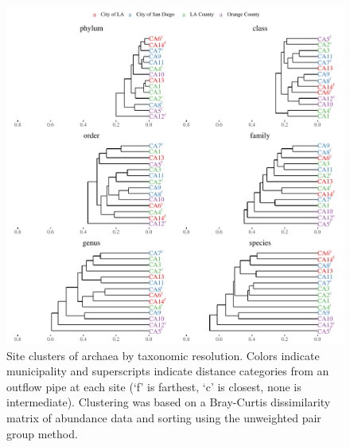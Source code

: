 \documentclass[letterpaper,12pt]{article}\usepackage[]{graphicx}\usepackage[]{color}
\newenvironment{knitrout}{}{} %
\begin{document}
\begin{knitrout}
\color{fgcolor}\begin{figure}[!ht]

{\centering \includegraphics[width=\textwidth]{figs/clust1_arch-1} 

}

\caption[Site clusters of archaea by taxonomic resolution]{Site clusters of archaea by taxonomic resolution.  Colors indicate municipality and superscripts indicate distance categories from an outflow pipe at each site (`f' is farthest, `c' is closest, none is intermediate).  Clustering was based on a Bray-Curtis dissimilarity matrix of abundance data and sorting using the unweighted pair group method.}\label{fig:clust1_arch}
\end{figure}


\end{knitrout}
\end{document}
